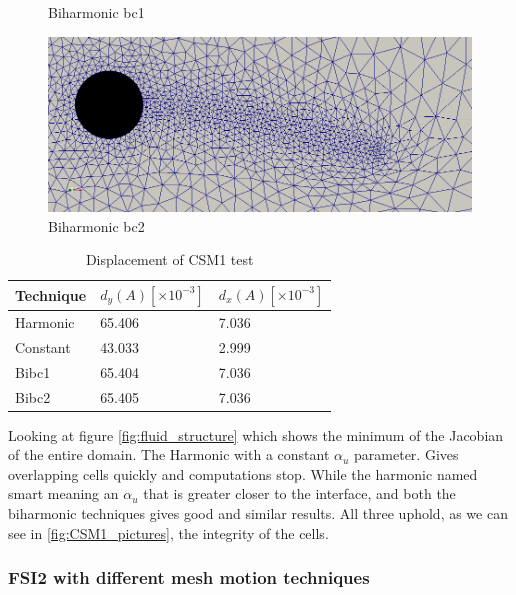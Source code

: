 \begin{figure}[H]
\begin{minipage}[b]{0.5\linewidth}
    \caption{Biharmonic bc1} 
    \vspace{4ex}
  \end{minipage}%
  \begin{minipage}[b]{0.5\linewidth}
    \centering
    \includegraphics[scale=0.2]{./Verification_Validation/Mesh_motion_results/CSM1_bibc2.png} 
    \caption{Biharmonic bc2} 
    \vspace{4ex}
  \end{minipage} 
\end{figure}



\begin{table}[H]
\centering
\caption{Displacement of CSM1 test}
\label{my-label}
\begin{tabular}{|l|l|l|}
\hline
Technique & $d_y(A) [\times 10^{-3}]$ & $d_x(A) [\times 10^{-3}]$ \\ \hline
Harmonic & 65.406 & 7.036 \\ \hline
Constant & 43.033 & 2.999 \\ \hline
Bibc1 & 65.404 & 7.036 \\ \hline
Bibc2 & 65.405 & 7.036 \\ \hline
\end{tabular}
\end{table}


Looking at figure \ref{fig:fluid_structure} which shows the minimum of the Jacobian of the entire domain. The Harmonic with a constant $\alpha_u$ parameter. Gives overlapping cells quickly and computations stop.
While the harmonic named smart meaning an $\alpha_u$ that is greater closer to the interface, and both the biharmonic techniques gives good and similar results. All three uphold, as we can see in \ref{fig:CSM1_pictures}, the integrity of the cells.
 


\subsubsection{FSI2 with different mesh motion techniques}

